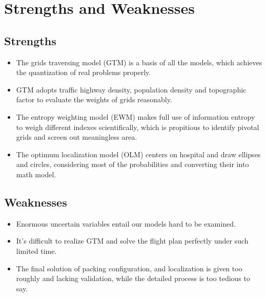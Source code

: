 \documentclass{mcmthesis}
\begin{document}
    
    
    \section{Strengths and Weaknesses}
    \subsection{Strengths}
    \begin{itemize}
    	\item The grids traversing model (GTM) is a basis of all the models, which achieves the quantization of real problems properly. 
    	\item GTM adopts traffic highway density, population density and topographic factor to evaluate the weights of grids reasonably.
    	\item The entropy weighting model (EWM) makes full use of information entropy to weigh different indexes scientifically, which is propitious to identify pivotal grids and screen out meaningless area. 
    	\item The optimum localization model (OLM) centers on hospital and draw ellipses and circles, considering most of the probabilities and converting their into math model.
    \end{itemize}
    \subsection{Weaknesses}
    \begin{itemize}
    	\item Enormous uncertain variables entail our models hard to be examined.
    	\item It's difficult to realize GTM and solve the flight plan perfectly under such limited time. 
    	\item The final solution of packing configuration, and localization is given too roughly and lacking validation, while the detailed process is too tedious to say. 
    \end{itemize}
\end{document}
